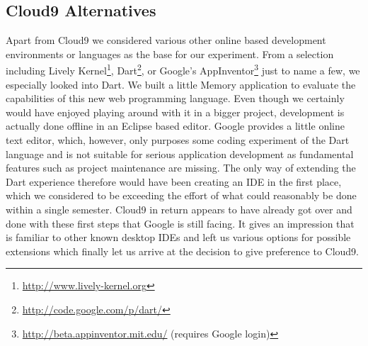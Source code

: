 \subsection{Cloud9 Alternatives}
Apart from Cloud9 we considered various other online based development environments or languages as the base for our experiment.
From a selection including Lively Kernel\footnote{\url{http://www.lively-kernel.org}},
Dart\footnote{\url{http://code.google.com/p/dart/}},
or Google's AppInventor\footnote{\url{http://beta.appinventor.mit.edu/} (requires Google login)} just to name a few,
we especially looked into Dart. We built a little Memory application to evaluate the capabilities of this
new web programming language. Even though we certainly would have enjoyed playing around with it in a bigger project,
development is actually done offline in an Eclipse based editor. Google provides a little online text editor, which,
however, only purposes some coding experiment of the Dart language and is not suitable for serious application development
as fundamental features such as project maintenance are missing. The only way of extending the Dart experience therefore
would have been creating an IDE in the first place, which we considered to be exceeding the effort of what could reasonably
be done within a single semester. Cloud9 in return appears to have already got over and done with these first steps that
Google is still facing. It gives an impression that is familiar to other known desktop IDEs and left us various options
for possible extensions which finally let us arrive at the decision to give preference to Cloud9.